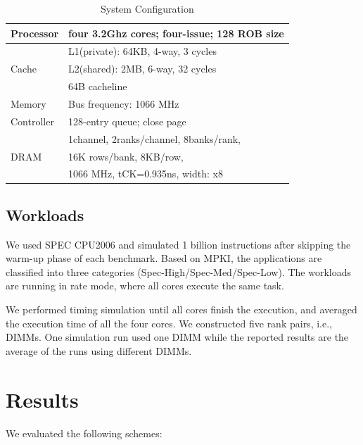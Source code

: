 \begin{table}[htbp]
\vspace{-0.2in}
\centering
\caption{System Configuration}
\vspace{-0.15in}
\scalebox{0.85}
{
\begin{tabular}{l|l}
\hline\hline
Processor				&four 3.2Ghz cores; four-issue; 128 ROB size\\
\hline
				&L1(private): 64KB, 4-way, 3 cycles\\
Cache			&L2(shared): 2MB, 6-way, 32 cycles\\
				&64B cacheline\\
\hline
Memory				&Bus frequency: 1066 MHz\\
Controller 	& 128-entry queue; close page\\
\hline
			&1channel, 2ranks/channel, 8banks/rank, \\
DRAM				&16K rows/bank, 8KB/row,\\
				&1066 MHz, tCK=0.935ns, width: x8\\
\hline\hline

\end{tabular}
}
\label{tab:configuration}
\vspace{-0.2in}
\end{table}

\subsection{Workloads}
We used SPEC CPU2006 and simulated 1 billion instructions after skipping the warm-up phase of each benchmark. 
Based on MPKI, the applications are classified into three categories (Spec-High/Spec-Med/Spec-Low).%
The workloads are running in rate mode, where all cores execute the same task.

We performed timing simulation until all cores finish the execution, and averaged the execution time of all the four cores. We constructed five rank pairs, i.e., DIMMs. One simulation run used one DIMM while the reported results are the average of the runs using different DIMMs.

\section{Results}
We evaluated the following schemes:

